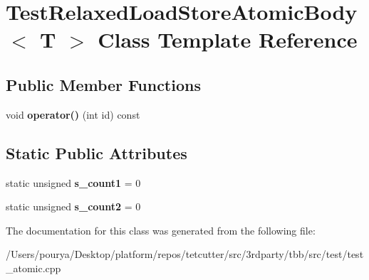 \hypertarget{classTestRelaxedLoadStoreAtomicBody}{}\section{Test\+Relaxed\+Load\+Store\+Atomic\+Body$<$ T $>$ Class Template Reference}
\label{classTestRelaxedLoadStoreAtomicBody}
\subsection*{Public Member Functions}
\begin{DoxyCompactItemize}
\item 
\hypertarget{classTestRelaxedLoadStoreAtomicBody_a2581ac42fb86043a218ab43fa8e25041}{}void {\bfseries operator()} (int id) const \label{classTestRelaxedLoadStoreAtomicBody_a2581ac42fb86043a218ab43fa8e25041}

\end{DoxyCompactItemize}
\subsection*{Static Public Attributes}
\begin{DoxyCompactItemize}
\item 
\hypertarget{classTestRelaxedLoadStoreAtomicBody_a4e164bd5fae51d357369c6e3c5cbba59}{}static unsigned {\bfseries s\+\_\+count1} = 0\label{classTestRelaxedLoadStoreAtomicBody_a4e164bd5fae51d357369c6e3c5cbba59}

\item 
\hypertarget{classTestRelaxedLoadStoreAtomicBody_a4b22867ca95bd90b655437685d549c3e}{}static unsigned {\bfseries s\+\_\+count2} = 0\label{classTestRelaxedLoadStoreAtomicBody_a4b22867ca95bd90b655437685d549c3e}

\end{DoxyCompactItemize}


The documentation for this class was generated from the following file\+:\begin{DoxyCompactItemize}
\item 
/\+Users/pourya/\+Desktop/platform/repos/tetcutter/src/3rdparty/tbb/src/test/test\+\_\+atomic.\+cpp\end{DoxyCompactItemize}

